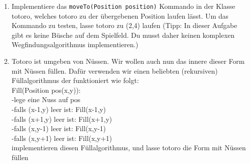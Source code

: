 
\begin{enumerate}
\item Implementiere das \lstinline{moveTo(Position position)} Kommando in der Klasse totoro, welches totoro zu der übergebenen Position laufen lässt. Um das Kommando zu testen, lasse totoro zu (2,4) laufen (Tipp: In dieser Aufgabe gibt es keine Büsche auf dem Spielfeld. Du musst daher keinen komplexen Wegfindungsalgorithmus implementieren.)
\item Totoro ist umgeben von Nüssen. Wir wollen auch nun das innere dieser Form mit Nüssen füllen. Dafür verwenden wir einen beliebten (rekursiven) Füllalgorithmus der funktioniert wie folgt:\\
Fill(Position pos(x,y)):\\
-lege eine Nuss auf pos\\
-falls (x-1,y) leer ist: Fill(x-1,y)\\
-falls (x+1,y) leer ist: Fill(x+1,y)\\
-falls (x,y-1) leer ist: Fill(x,y-1)\\
-falls (x,y+1) leer ist: Fill(x,y+1)\\

implementieren diesen Füllalgorithmus, und lasse totoro die Form mit Nüssen füllen
\end{enumerate}
